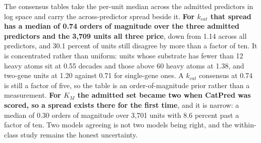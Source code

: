The consensus tables take the per-unit median across the admitted predictors in log space
and carry the across-predictor spread beside it. \textbf{For $k_{cat}$ that spread has a
median of 0.74 orders of magnitude over the three admitted predictors and the 3{,}709 units
all three price}, down from 1.14 across all predictors, and 30.1 percent of units still
disagree by more than a factor of ten. It is concentrated rather than uniform: units whose
substrate has fewer than 12 heavy atoms sit at 0.55 decades and those above 60 heavy atoms
at 1.38, and two-gene units at 1.20 against 0.71 for single-gene ones. A $k_{cat}$ consensus
at 0.74 is still a factor of five, so the table is an order-of-magnitude prior rather than a
measurement. \textbf{For $K_M$ the admitted set became two when CatPred was scored, so a
spread exists there for the first time}, and it is narrow: a median of 0.30 orders of
magnitude over 3{,}701 units with 8.6 percent past a factor of ten. Two models agreeing is
not two models being right, and the within-class study remains the honest uncertainty.

